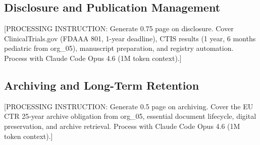 \subsection{Disclosure and Publication Management}

[PROCESSING INSTRUCTION: Generate 0.75 page on disclosure. Cover ClinicalTrials.gov
(FDAAA 801, 1-year deadline), CTIS results (1 year, 6 months pediatric from org\_05),
manuscript preparation, and registry automation.
Process with Claude Code Opus 4.6 (1M token context).]

\subsection{Archiving and Long-Term Retention}

[PROCESSING INSTRUCTION: Generate 0.5 page on archiving. Cover the EU CTR 25-year
archive obligation from org\_05, essential document lifecycle, digital preservation,
and archive retrieval. Process with Claude Code Opus 4.6 (1M token context).]

